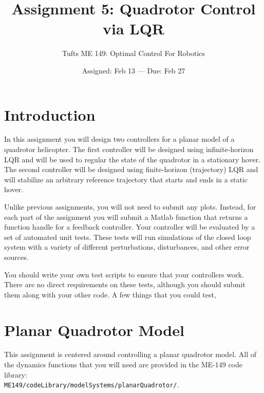 

\title{Assignment 5:  Quadrotor Control via LQR}
\date{Assigned:  Feb 13  ---  Due:  Feb 27}
\author{Tufts ME 149:  Optimal Control For Robotics}

\maketitle

\section*{Introduction}

In this assignment you will design two controllers for a
planar model of a quadrotor helicopter.
The first controller will be designed using infinite-horizon LQR and
will be used to regular the state of the quadrotor in a stationary hover.
The second controller will be designed using finite-horizon (trajectory) LQR
and will stabilize an arbitrary reference trajectory that starts and ends in
a static hover.

\par
Unlike previous assignments, you will not need to submit any plots.
Instead, for each part of the assignment you will submit a Matlab function
that returns a function handle for a feedback controller.
Your controller will be evaluated by a set of automated unit tests.
These tests will run simulations of the closed loop system with a variety of
different perturbations, disturbances, and other error sources.

\par
You should write your own test scripts to ensure that your controllers work.
There are no direct requirements on these tests, although you should submit them
along with your other code. A few things that you could test,

\section*{Planar Quadrotor Model}

This assignment is centered around controlling a planar quadrotor model.
All of the dynamics functions that you will need are provided in the ME-149
code library:\\
\texttt{ME149/codeLibrary/modelSystems/planarQuadrotor/}.

